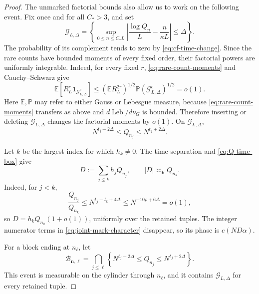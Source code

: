 \documentclass[11pt]{article}
\numberwithin{equation}{section}
\theoremstyle{definition}
\newcommand{\E}{\mathbb E}
\newcommand{\Pp}{\mathbb P}
\newcommand{\1}{\mathbf 1}
\newcommand{\Leb}{\operatorname{Leb}}
\begin{document}
\begin{proof}
The unmarked factorial bounds also allow us to work on the following
event.  Fix once and for all \(C_*>3\), and set
\begin{equation}\label{eq:good-time-event}
 \mathcal G_{L,\Delta}=
 \left\{
 \sup_{0\le n\le C_*L}
 \left|\frac{\log Q_n}{L}-\frac{n}{\kappa L}\right|
 \le\Delta\right\}.
\end{equation}
The probability of its complement tends to zero by
\eqref{eq:cf-time-change}.  Since the rare counts have bounded moments
of every fixed order, their factorial powers are uniformly integrable.
Indeed, for every fixed \(r\), \eqref{eq:rare-count-moments} and
Cauchy--Schwarz give
\begin{equation}\label{eq:good-event-UI}
 \E\!\left[R_L^r\1_{\mathcal G_{L,\Delta}^c}\right]
 \le(\E R_L^{2r})^{1/2}
    \Pp(\mathcal G_{L,\Delta}^c)^{1/2}=o(1).
\end{equation}
Here \(\E,\Pp\) may refer to either Gauss or Lebesgue measure, because
\eqref{eq:rare-count-moments} transfers as above and
\(d\Leb/d\nu_G\) is bounded.
Therefore inserting or deleting
\(\mathcal G_{L,\Delta}\) changes the factorial moments by \(o(1)\).
On \(\mathcal G_{L,\Delta}\),
\begin{equation}\label{eq:Q-time-box}
 N^{t_j-2\Delta}\le Q_{n_j}\le N^{t_j+2\Delta}.
\end{equation}

Let \(k\) be the largest index for which \(h_k\ne0\).  The time
separation and \eqref{eq:Q-time-box} give
\begin{equation}\label{eq:D-dominance}
 D:=\sum_{j\le k}h_jQ_{n_j},\qquad
 |D|\asymp_{\mathbf h}Q_{n_k}.
\end{equation}
Indeed, for \(j<k\),
\[
 \frac{Q_{n_j}}{Q_{n_k}}
 \le N^{t_j-t_k+4\Delta}
 \le N^{-10\rho+6\Delta}=o(1),
\]
so \(D=h_kQ_{n_k}(1+o(1))\), uniformly over the retained tuples.
The integer numerator terms in \eqref{eq:joint-mark-character}
disappear, so its phase is \(e(ND\alpha)\).

For a block ending at \(n_\ell\), let
\begin{equation}\label{eq:local-denominator-event}
 \mathcal B_{\mathbf n,\ell}
 =\bigcap_{j\le\ell}
 \left\{N^{t_j-2\Delta}\le Q_{n_j}
                         \le N^{t_j+2\Delta}\right\}.
\end{equation}
This event is measurable on the cylinder through \(n_\ell\), and it
contains \(\mathcal G_{L,\Delta}\) for every retained tuple.


\end{proof}
\end{document}
